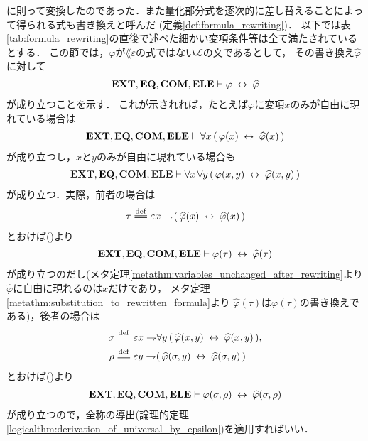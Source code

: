 	に則って変換したのであった．また量化部分式を逐次的に差し替えることによって得られる式も書き換えと呼んだ
	(定義\ref{def:formula_rewriting})．
	以下では表\ref{tab:formula_rewriting}の直後で述べた細かい変項条件等は全て満たされているとする．
	この節では，$\varphi$が$\lang{\varepsilon}$の式ではない$\mathcal{L}$の文であるとして，
	その書き換え$\widehat{\varphi}$に対して
	\begin{align}
		\mbox{{\bf EXT}},\mbox{{\bf EQ}},\mbox{\bf COM},\mbox{{\bf ELE}} \vdash \varphi \hspace{0.25em}\leftrightarrow\hspace{0.25em} \widehat{\varphi}
		\label{formula_rewriting_1}
	\end{align}
	が成り立つことを示す．
	これが示されれば，たとえば$\varphi$に変項$x$のみが自由に現れている場合は
	\begin{align}
		\mbox{{\bf EXT}},\mbox{{\bf EQ}},\mbox{\bf COM},\mbox{{\bf ELE}} \vdash \forall x\, (\, \varphi(x) \hspace{0.25em}\leftrightarrow\hspace{0.25em} \widehat{\varphi}(x)\, )
	\end{align}
	が成り立つし，$x$と$y$のみが自由に現れている場合も
	\begin{align}
		\mbox{{\bf EXT}},\mbox{{\bf EQ}},\mbox{\bf COM},\mbox{{\bf ELE}} \vdash \forall x\, \forall y\, (\, \varphi(x,y) \hspace{0.25em}\leftrightarrow\hspace{0.25em} \widehat{\varphi}(x,y)\, )
	\end{align}
	が成り立つ．実際，前者の場合は
	\begin{align}
		\tau \defeq \varepsilon x \negation (\, \widehat{\varphi}(x) \lrarrow \widehat{\varphi}(x)\, )
	\end{align}
	とおけば()より
	\begin{align}
		\mbox{{\bf EXT}},\mbox{{\bf EQ}},\mbox{\bf COM},\mbox{{\bf ELE}} \vdash \varphi(\tau) \hspace{0.25em}\leftrightarrow\hspace{0.25em} \widehat{\varphi}(\tau)
	\end{align}
	が成り立つのだし(メタ定理\ref{metathm:variables_unchanged_after_rewriting}より
	$\widehat{\varphi}$に自由に現れるのは$x$だけであり，
	メタ定理\ref{metathm:substitution_to_rewritten_formula}より
	$\widehat{\varphi}(\tau)$は$\varphi(\tau)$の書き換えである)，後者の場合は
	\begin{align}
		\sigma &\defeq \varepsilon x \negation \forall y\, (\, \widehat{\varphi}(x,y) \lrarrow \widehat{\varphi}(x,y)\, ), \\
		\rho &\defeq \varepsilon y \negation (\, \widehat{\varphi}(\sigma,y) \lrarrow \widehat{\varphi}(\sigma,y)\, )
	\end{align}
	とおけば()より
	\begin{align}
		\mbox{{\bf EXT}},\mbox{{\bf EQ}},\mbox{\bf COM},\mbox{{\bf ELE}} \vdash \varphi(\sigma,\rho) \hspace{0.25em}\leftrightarrow\hspace{0.25em} \widehat{\varphi}(\sigma,\rho)
	\end{align}
	が成り立つので，全称の導出(論理的定理\ref{logicalthm:derivation_of_universal_by_epsilon})を適用すればいい．
